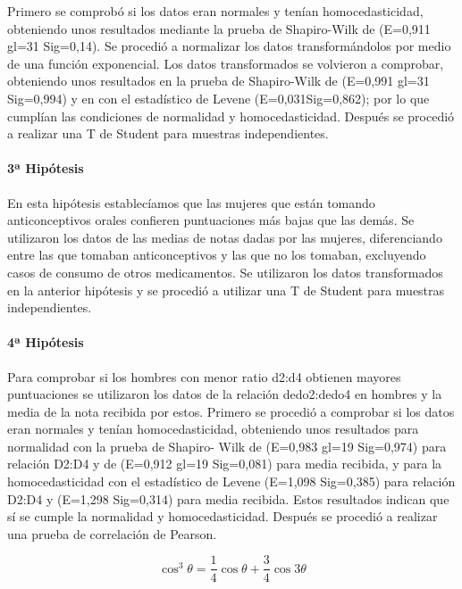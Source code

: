 \documentclass[fleqn,10pt]{SelfArx} %
\begin{document}
Primero se comprobó si los datos eran normales y tenían homocedasticidad, obteniendo unos resultados mediante la prueba de Shapiro-Wilk de (E=0,911 gl=31 Sig=0,14). Se procedió a normalizar los datos transformándolos por medio de una función exponencial. Los datos transformados se volvieron a comprobar, obteniendo unos resultados en la prueba de Shapiro-Wilk de (E=0,991 gl=31 Sig=0,994) y en con el estadístico de Levene (E=0,031Sig=0,862); por lo que cumplían las condiciones de normalidad y homocedasticidad. Después se procedió a realizar una T de Student para muestras independientes.

\paragraph{3ª Hipótesis} 

En esta hipótesis establecíamos que las mujeres que están tomando anticonceptivos orales confieren puntuaciones más bajas que las demás. Se utilizaron los datos de las medias de notas dadas por las mujeres, diferenciando entre las que tomaban anticonceptivos y las que no los tomaban, excluyendo casos de consumo de otros medicamentos. Se utilizaron los datos transformados en la anterior hipótesis y se procedió a utilizar una T de Student para muestras independientes.

\paragraph{4ª Hipótesis} 

Para comprobar si los hombres con menor ratio d2:d4 obtienen mayores puntuaciones se utilizaron los datos de la relación dedo2:dedo4 en hombres y la media de la nota recibida por estos. Primero se procedió a comprobar si los datos eran normales y tenían homocedasticidad, obteniendo unos resultados para normalidad con la prueba de Shapiro- Wilk de (E=0,983 gl=19 Sig=0,974) para relación D2:D4 y de (E=0,912 gl=19 Sig=0,081) para media recibida, y para la homocedasticidad con el estadístico de Levene (E=1,098 Sig=0,385) para relación D2:D4 y (E=1,298 Sig=0,314) para media recibida. Estos resultados indican que sí se cumple la normalidad y homocedasticidad. Después se procedió a realizar una prueba de correlación de Pearson.

\begin{equation}
	\cos^3 \theta =\frac{1}{4}\cos\theta+\frac{3}{4}\cos 3\theta
	\label{eq:refname2}
\end{equation}
\end{document}
